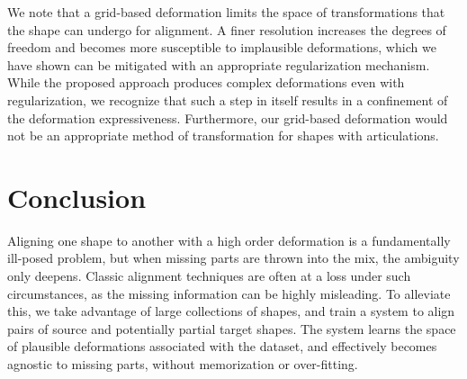 \documentclass[acmtog,timestamp]{acmart}%
\begin{document}
We note that a grid-based deformation limits the space of transformations that the shape can undergo for alignment.
A finer resolution increases the degrees of freedom and becomes more susceptible to implausible deformations, which we have shown can be mitigated with an appropriate regularization mechanism. 
While the proposed approach produces complex deformations even with regularization, we recognize that such a step in itself results in a confinement of the deformation expressiveness.
Furthermore, our grid-based deformation would not be an appropriate method of transformation for shapes with articulations.
\section{Conclusion}

Aligning one shape to another with a high order deformation is a fundamentally ill-posed problem, but when missing parts are thrown into the mix, the ambiguity only deepens. Classic alignment techniques are often at a loss under such circumstances, as the missing information can be highly misleading.
To alleviate this, we take advantage of large collections of shapes, and train a system to align pairs of source and potentially partial target shapes. The system learns the space of plausible deformations associated with the dataset, and effectively becomes agnostic to missing parts, without memorization or over-fitting.
\end{document}
